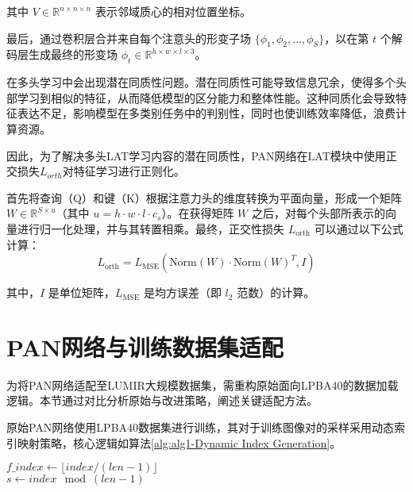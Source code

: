其中 \( V \in \mathbb{R}^{n \times n \times n} \) 表示邻域质心的相对位置坐标。

最后，通过卷积层合并来自每个注意头的形变子场 \( \{ \phi_1, \phi_2, \ldots, \phi_S \} \)，以在第 \( t \) 个解码层生成最终的形变场 \( \phi_t \in \mathbb{R}^{h \times w \times l \times 3} \)。

在多头学习中会出现潜在同质性问题。潜在同质性可能导致信息冗余，使得多个头部学习到相似的特征，从而降低模型的区分能力和整体性能。这种同质化会导致特征表达不足，影响模型在多类别任务中的判别性，同时也使训练效率降低，浪费计算资源。

因此，为了解决多头LAT学习内容的潜在同质性，PAN网络在LAT模块中使用正交损失$L_{orth}$对特征学习进行正则化\cite{brock2016neural}。

首先将查询（Q）和键（K）根据注意力头的维度转换为平面向量，形成一个矩阵 \( W \in \mathbb{R}^{S \times u} \)（其中 \( u = h \cdot w \cdot l \cdot c_s \)）。在获得矩阵 \( W \) 之后，对每个头部所表示的向量进行归一化处理，并与其转置相乘。最终，正交性损失 \( L_{\text{orth}} \) 可以通过以下公式计算：
\begin{equation}
    L_{\text{orth}} = L_{\text{MSE}}\left(\text{Norm}(W) \cdot \text{Norm}(W)^T, I\right)
\end{equation}

其中，\( I \) 是单位矩阵，\( L_{\text{MSE}} \) 是均方误差（即 \( l_2 \) 范数）的计算。

\section{PAN网络与训练数据集适配}

为将PAN网络适配至LUMIR大规模数据集，需重构原始面向LPBA40的数据加载逻辑。本节通过对比分析原始与改进策略，阐述关键适配方法。

原始PAN网络使用LPBA40数据集进行训练，其对于训练图像对的采样采用动态索引映射策略，核心逻辑如算法\ref{alg:alg1-Dynamic Index Generation}。

\begin{algorithm}

    \label{alg:alg1-Dynamic Index Generation}

    $f\_index \gets \lfloor index / (len-1) \rfloor$ \\
    $s \gets index \mod (len-1)$ \\
\end{algorithm}


